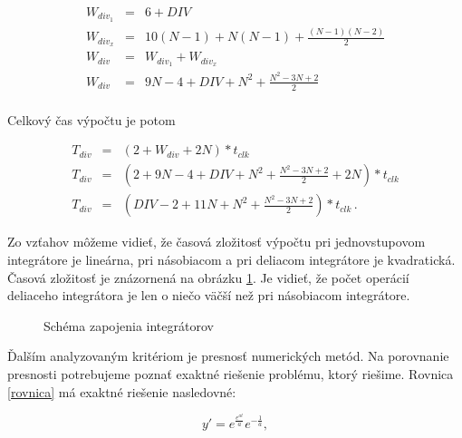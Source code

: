 \begin{eqnarray}
W_{div_1} & = & 6 + DIV \nonumber \\ 
W_{div_x} & = & 10(N-1) + N(N-1) + \frac{(N-1)(N-2)}{2} \nonumber \\ 
W_{div} & = & W_{div_1} + W_{div_x} \nonumber \\ 
W_{div} & = & 9N - 4 + DIV + N^2 + \frac{N^2-3N+2}{2} \nonumber \\ 
\end{eqnarray}

Celkový čas výpočtu je potom  

\begin{eqnarray}
T_{div} & = & (2 + W_{div} + 2N)*t_{clk} \nonumber \\ 
T_{div} & = & (2 + 9N - 4 + DIV + N^2 + \frac{N^2-3N+2}{2} + 2N)*t_{clk} \nonumber \\
T_{div} & = & (DIV - 2 + 11N + N^2 + \frac{N^2-3N+2}{2})*t_{clk} \, .
\end{eqnarray}

Zo vzťahov môžeme vidieť, že časová zložitosť výpočtu pri jednovstupovom integrátore je lineárna, pri násobiacom a pri deliacom integrátore je kvadratická. Časová zložitosť je znázornená na obrázku \ref{graf}. Je vidieť, že počet operácií deliaceho integrátora je len o niečo väčší než pri násobiacom integrátore. 

\begin{figure}[H]
\centering
{}
\caption{Schéma zapojenia integrátorov}
\label{graf}
\end{figure}


\newpage
Ďalším analyzovaným kritériom je presnosť numerických metód. Na porovnanie presnosti potrebujeme poznať exaktné riešenie problému, ktorý riešime. Rovnica \ref{rovnica} má exaktné riešenie nasledovné:

\begin{equation}
y' = e^{\frac{e^{at}}{a}} e^{-\frac{1}{a}} ,
\end{equation}
\bigskip


